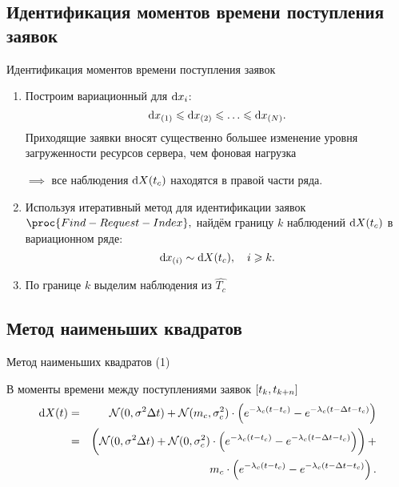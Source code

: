 \documentclass[utf8,handout]{beamer}
\begin{document}
\subsection{Идентификация моментов времени поступления заявок}
\begin{frame}{Идентификация моментов времени поступления заявок}
\begin{enumerate}
\item Построим вариационный для $\dif x_i$:
  $$\dif x_{(1)} \leqslant \dif x_{(2)} \leqslant \ldots 
    \leqslant \dif x_{(N)}.$$
  Приходящие заявки вносят существенно большее изменение уровня загруженности
  ресурсов сервера, чем фоновая нагрузка

  $\implies$ все наблюдения $\dif X(t_c)$ находятся в правой части ряда.

\item Используя итеративный метод для идентификации заявок 
$\proc{Find-Request-Index},$
найдём границу $k$ наблюдений $\dif X(t_c)$ в вариационном ряде:
$$
  \dif x_{(i)} \sim \dif X(t_c), \quad i \geqslant k.
$$

\item По границе $k$ выделим наблюдения из $\widehat{T_c}$
\end{enumerate}
\end{frame}


\subsection[МНК]{Метод наименьших квадратов}
\begin{frame}{Метод наименьших квадратов (1)}
\begin{block}{В моменты времени между поступлениями заявок $\sbr{t_k, t_{k+n}}$}
\begin{eqnarray*}
\dif X(t) 
  & = & \mathcal{N}(0, \sigma^2 \Delta t) + 
      \mathcal{N}(m_c, \sigma_c^2) \cdot 
        \del{e^{-\lambda_c(t - t_c)} - e^{-\lambda_c(t - \Delta t - t_c)}} \\
  & = & \del{
      \mathcal{N}(0, \sigma^2 \Delta t) + 
      \mathcal{N}(0, \sigma_c^2) \cdot 
        \del{e^{-\lambda_c(t - t_c)} - e^{-\lambda_c(t - \Delta t - t_c)}}} +\\
      && m_c \cdot 
        \del{e^{-\lambda_c(t - t_c)} - e^{-\lambda_c(t - \Delta t - t_c)}}.
\end{eqnarray*}
\end{block}
\end{frame}
\end{document}
